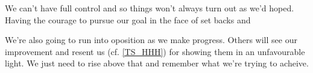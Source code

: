 \cleardoublepage
\begin{multicols}{2}

We can't have full control and so things won't always turn out as we'd hoped. Having the courage to pursue our goal in the face of set backs and 

We're also going to run into oposition as we make progress. Others will see our improvement and resent us (cf. \ref{TS_HHH}) for showing them in an unfavourable light. We just need to rise above that and remember what we're trying to acheive. 

\end{multicols}
\clearpage
